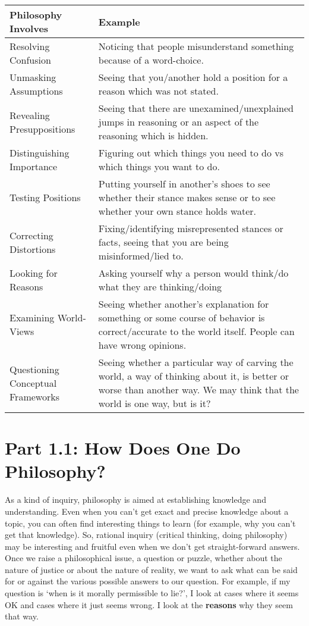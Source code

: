 \begin{tabular}{p{2in}|p{3.5in}}\hline
Philosophy Involves&Example\\\hline
Resolving Confusion &Noticing that people misunderstand something because of a word-choice.\\\hline
Unmasking Assumptions &Seeing that you/another hold a position for a reason which was not stated.\\\hline
Revealing Presuppositions &Seeing that there are unexamined/unexplained jumps in reasoning or an aspect of the reasoning which is hidden.\\\hline
Distinguishing Importance &Figuring out which things you need to do vs which things you want to do.\\\hline
Testing Positions &Putting yourself in another's shoes to see whether their stance makes sense or to see whether your own stance holds water.\\\hline
Correcting Distortions &Fixing/identifying misrepresented stances or facts, seeing that you are being misinformed/lied to.\\\hline
Looking for Reasons &Asking yourself why a person would think/do what they are thinking/doing\\\hline
Examining World-Views &Seeing whether another's explanation for something or some course of behavior is correct/accurate to the world itself. People can have wrong opinions.\\ \hline
Questioning Conceptual Frameworks &Seeing whether a particular way of carving the world, a way of thinking about it, is better or worse than another way. We may think that the world is one way, but is it?
\end{tabular}

\section{Part 1.1: How Does One Do Philosophy?}
\label{s:p1.1}
As a kind of inquiry, philosophy is aimed at establishing knowledge and understanding. Even when you can't get exact and precise knowledge about a topic, you can often find interesting things to learn (for example, why you can't get that knowledge). So, rational inquiry (critical thinking, doing philosophy) may be interesting and fruitful even when we don't get straight-forward answers. Once we raise a philosophical issue, a question or puzzle, whether about the nature of justice or about the nature of reality, we want to ask what can be said for or against the various possible answers to our question. For example, if my question is `when is it morally permissible to lie?', I look at cases where it seems OK and cases where it just seems wrong. I look at the \textbf{reasons} why they seem that way.


